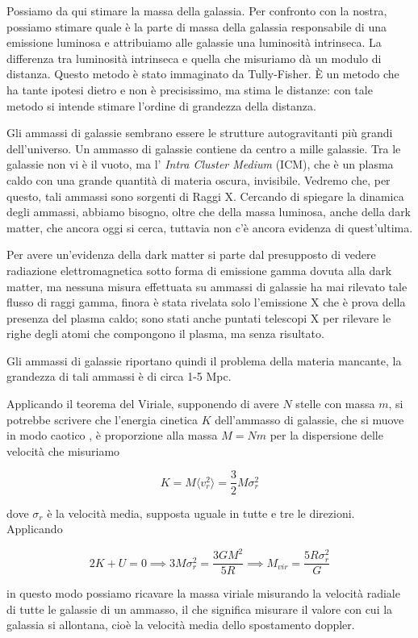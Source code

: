 Possiamo da qui stimare la massa della galassia. Per confronto con la nostra, possiamo stimare quale è la parte di massa della galassia responsabile di una emissione luminosa e attribuiamo alle galassie una luminosità intrinseca. La differenza tra luminosità intrinseca e quella che misuriamo dà un modulo di distanza. Questo metodo è stato immaginato da Tully-Fisher. È un metodo che ha tante ipotesi dietro e non è precisissimo, ma stima le distanze: con tale metodo si intende stimare l'ordine di grandezza della distanza.

Gli ammassi di galassie sembrano essere le strutture autogravitanti più grandi dell'universo. Un ammasso di galassie contiene da centro a mille galassie. Tra le galassie non vi è il vuoto, ma l' \textit{Intra Cluster Medium} (ICM), che è un plasma caldo con una grande quantità di materia oscura, invisibile. Vedremo che, per questo, tali ammassi sono sorgenti di Raggi X. Cercando di spiegare la dinamica degli ammassi, abbiamo bisogno, oltre che della massa luminosa, anche della dark matter, che ancora oggi si cerca, tuttavia non c'è ancora evidenza di quest'ultima.

Per avere un'evidenza della dark matter si parte dal presupposto di vedere radiazione elettromagnetica sotto forma di emissione gamma dovuta alla dark matter, ma nessuna misura effettuata su ammassi di galassie ha mai rilevato tale flusso di raggi gamma, finora è stata rivelata solo l'emissione X che è prova della presenza del plasma caldo; sono stati anche puntati telescopi X per rilevare le righe degli atomi che compongono il plasma, ma senza risultato.

Gli ammassi di galassie riportano quindi il problema della materia mancante, la grandezza di tali ammassi è di circa 1-5 Mpc.

Applicando il teorema del Viriale, supponendo di avere $N$ stelle con massa $m$, si potrebbe scrivere che l'energia cinetica $K$ dell'ammasso di galassie, che si muove in modo caotico , è proporzione alla massa $M=Nm$ per la dispersione delle velocità che misuriamo

$$K=M \langle v_r^2 \rangle=\frac{3}{2}M\sigma_r^2$$

dove $\sigma_r$ è la velocità media, supposta uguale in tutte e tre le direzioni. Applicando

$$2K+U=0 \implies 3M\sigma_r^2=\frac{3GM^2}{5R}\implies M_{vir}=\frac{5R\sigma_r^2}{G}$$

in questo modo possiamo ricavare la massa viriale misurando la velocità radiale di tutte le galassie di un ammasso, il che significa misurare il valore con cui la galassia si allontana, cioè la velocità media dello spostamento doppler.

